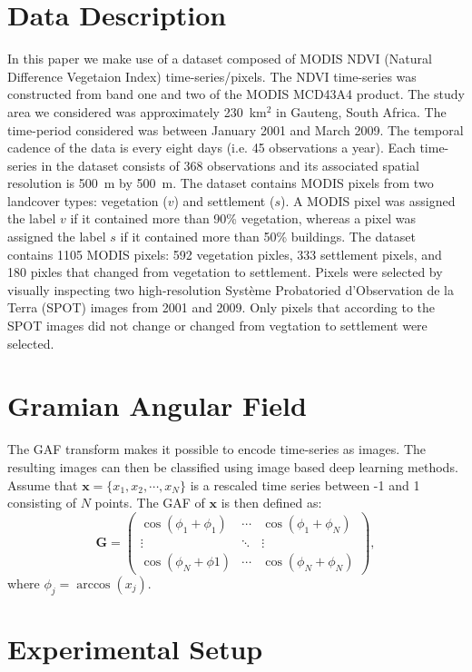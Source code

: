 \documentclass{article}
\begin{document}
\section{Data Description}
In this paper we make use of a dataset composed of MODIS NDVI (Natural Difference Vegetaion Index) time-series/pixels. The NDVI time-series was constructed from band one and two of the MODIS MCD43A4 product. The study area we considered was approximately 230~km$^2$ in Gauteng, South Africa. The time-period considered was between January 2001 and March 2009. The temporal cadence of the data is every eight days (i.e. 45 observations a year). Each time-series in the dataset consists of 368 observations and its associated spatial resolution is 500~m by 500~m. The dataset contains MODIS pixels from two landcover types: vegetation ($v$) and settlement ($s$). A MODIS pixel was assigned the label $v$ if it contained more than 90\% vegetation, whereas a pixel was assigned the label $s$ if it contained more than 50\% buildings. The dataset contains 1105 MODIS pixels: 592 vegetation pixles, 333 settlement pixels, and 180 pixles that changed from vegetation to settlement. Pixels were selected by visually inspecting two high-resolution Syst\`{e}me Probatoried d'Observation de la Terra (SPOT) images from 2001 and 2009. Only pixels that according to the SPOT images did not change or changed from vegtation to settlement were selected.

\section{Gramian Angular Field}
\label{sec:GAF}
The GAF transform makes it possible to encode time-series as images. The resulting images can then be classified using image based deep learning methods. Assume that $\mathbf{x} = \{x_1,x_2,\cdots,x_N\}$ is a rescaled time series between -1 and 1 consisting of $N$ points. The GAF of $\mathbf{x}$ is then defined as: 
\begin{equation}
\mathbf{G} = \begin{pmatrix}
\cos(\phi_1+\phi_1) & \cdots & \cos(\phi_1+\phi_N)\\
\vdots& \ddots &\vdots\\
\cos(\phi_N+\phi1)&\cdots&\cos(\phi_N+\phi_N)
\end{pmatrix},\nonumber
\end{equation}
where $\phi_j = \arccos(x_j)$.
  
\section{Experimental Setup}
\label{sec:exp}
\end{document}
